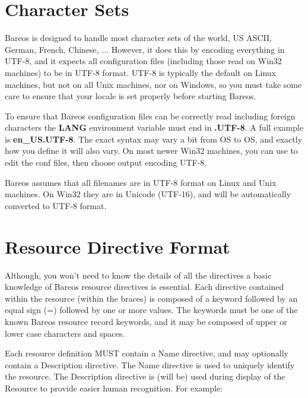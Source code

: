 \section{Character Sets}
Bareos is designed to handle most character sets of the world,
US ASCII, German, French, Chinese, ...  However, it does this by
encoding everything in UTF-8, and it expects all configuration files
(including those read on Win32 machines) to be in UTF-8 format.
UTF-8 is typically the default on Linux machines, but not on all
Unix machines, nor on Windows, so you must take some care to ensure
that your locale is set properly before starting Bareos.

To ensure that Bareos configuration files can be correctly read including
foreign characters the {\bf LANG} environment variable
must end in {\bf .UTF-8}. A full example is {\bf en\_US.UTF-8}. The
exact syntax may vary a bit from OS to OS, and exactly how you define
it will also vary.  On most newer Win32 machines, you can use 
to edit the conf files, then choose output encoding UTF-8.

Bareos assumes that all filenames are in UTF-8 format on Linux and
Unix machines. On Win32 they are in Unicode (UTF-16), and will
be automatically converted to UTF-8 format.

\section{Resource Directive Format}

Although, you won't need to know the details of all the directives a basic
knowledge of Bareos resource directives is essential. Each directive contained
within the resource (within the braces) is composed of a keyword followed by
an equal sign (=) followed by one or more values. The keywords must be one of
the known Bareos resource record keywords, and it may be composed of upper or
lower case characters and spaces.

Each resource definition MUST contain a Name directive, and may optionally
contain a Description directive. The Name directive is used to
uniquely identify the resource. The Description directive is (will be) used
during display of the Resource to provide easier human recognition. For
example:

\hide{$}


